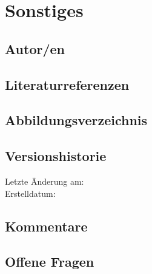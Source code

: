
\section*{Sonstiges}

\subsection*{Autor/en}
\authors

\subsection*{Literaturreferenzen}
\literature
\nocite{*}


\subsection*{Abbildungsverzeichnis}
\figures

\subsection*{Versionshistorie}
Letzte Änderung am: \versionhistory \\
Erstelldatum: \dateofcreation

\subsection*{Kommentare}
\comments

\subsection*{Offene Fragen}
\questions

